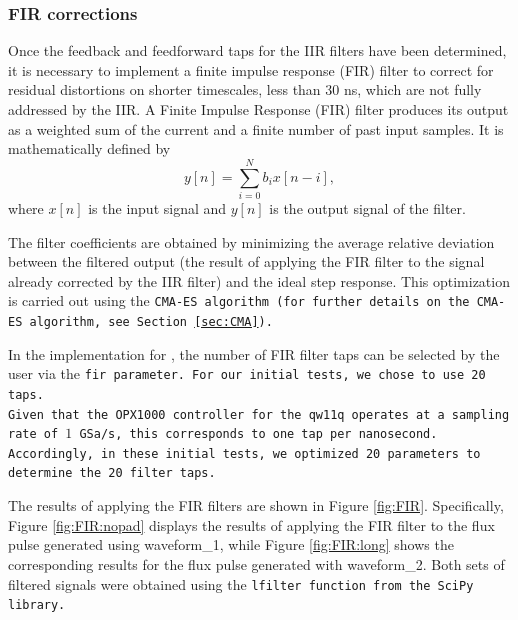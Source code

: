 \subsubsection{FIR corrections}
Once the feedback and feedforward taps for the IIR filters have been determined, it is necessary to implement a finite impulse response (FIR) filter to correct for residual distortions on shorter timescales, less than 30 ns, which are not fully addressed by the IIR.
A Finite Impulse Response (FIR) filter produces its output as a weighted sum of the current and a finite number of past input samples. It is mathematically defined by
\begin{equation}
        y[n] = \sum_{i=0}^{N} b_i x[n - i],
\end{equation}
where $x[n]$ is the input signal and $y[n]$ is the output signal of the filter.

The filter coefficients are obtained by minimizing the average relative deviation between the filtered output (the result of applying the FIR filter to the signal already corrected by the IIR filter) and the ideal step response. 
This optimization is carried out using the \tt{CMA-ES} algorithm (for further details on the \tt{CMA-ES} algorithm, see Section \ref{sec:CMA}).

In the implementation for \Qibocal, the number of FIR filter taps can be selected by the user via the \tt{fir} parameter. 
For our initial tests, we chose to use 20 taps.\\
Given that the OPX1000 controller for the qw11q operates at a sampling rate of $1$ GSa/s, this corresponds to one tap per nanosecond. 
Accordingly, in these initial tests, we optimized 20 parameters to determine the 20 filter taps.

The results of applying the FIR filters are shown in Figure \ref{fig:FIR}. 
Specifically, Figure \ref{fig:FIR:nopad} displays the results of applying the FIR filter to the flux pulse generated using waveform\_1, while Figure \ref{fig:FIR:long} shows the corresponding results for the flux pulse generated with waveform\_2. 
Both sets of filtered signals were obtained using the \tt{lfilter} function from the \tt{SciPy} library.


